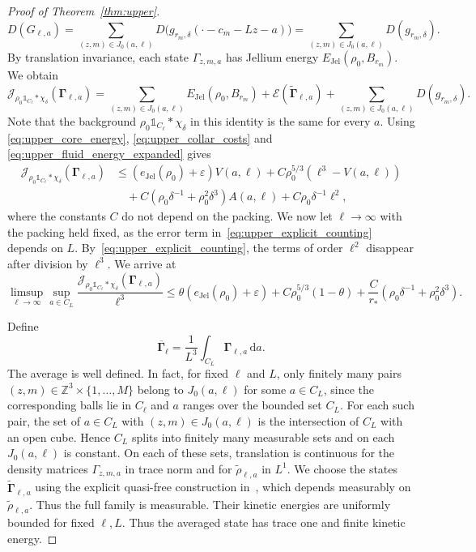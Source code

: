 \documentclass[final,reqno]{amsart}
\theoremstyle{remark}
\theoremstyle{definition}
\renewcommand{\le}{\leqslant}
\newcommand{\ZZ}{\mathbb{Z}}
\newcommand{\iden}{\mathbb{1}}
\newcommand{\EC}{\mathcal{E}}
\newcommand{\Jel}{\mathrm{Jel}}
\newcommand{\vGamma}{{\bm{\Gamma}}}
\begin{document}
\begin{proof}[Proof of Theorem~\ref{thm:upper}]
\[
D(G_{\ell,a})=\sum_{(z,m)\in J_0(a,\ell)}D\big(g_{r_m,\delta}(\cdot-c_m-Lz-a)\big)=\sum_{(z,m)\in J_0(a,\ell)}D(g_{r_m,\delta}).
\]
By translation invariance, each state $\Gamma_{z,m,a}$ has Jellium energy $E_\Jel(\rho_0,B_{r_m})$. We obtain
\begin{equation}\label{eq:upper_exact_identity}
\mathcal J_{\rho_0\iden_{C_\ell}*\chi_\delta}(\vGamma_{\ell,a})
=\sum_{(z,m)\in J_0(a,\ell)}
E_\Jel(\rho_0,B_{r_m})
+\EC(\tilde\vGamma_{\ell,a})
+\sum_{(z,m)\in J_0(a,\ell)}D(g_{r_m,\delta}).
\end{equation}
Note that the background $\rho_0\iden_{C_\ell}*\chi_\delta$ in this identity is the same for every $a$.
Using \eqref{eq:upper_core_energy}, \eqref{eq:upper_collar_costs} and \eqref{eq:upper_fluid_energy_expanded} gives
\begin{equation}\label{eq:upper_prelimit_estimate}
\begin{aligned}
\mathcal J_{\rho_0\iden_{C_\ell}*\chi_\delta}(\vGamma_{\ell,a})
&\le(e_\Jel(\rho_0)+\varepsilon)V(a,\ell)
+C\rho_0^{5/3}(\ell^3-V(a,\ell))\\
&\quad+C\left(\rho_0\delta^{-1}+\rho_0^2\delta^3\right)A(a,\ell)+C\rho_0\delta^{-1}\ell^2,
\end{aligned}
\end{equation}
where the constants $C$ do not depend on the packing. We now let $\ell\to\infty$ with the packing held fixed, as the error term in~\eqref{eq:upper_explicit_counting} depends on $L$. By~\eqref{eq:upper_explicit_counting}, the terms of order $\ell^2$ disappear after division by $\ell^3$. We arrive at
\begin{equation}\label{eq:upper_fixed_packing}
\limsup_{\ell\to\infty}\sup_{a\in C_L}
\frac{\mathcal J_{\rho_0\iden_{C_\ell}*\chi_\delta}(\vGamma_{\ell,a})}{\ell^3}
\le\theta(e_\Jel(\rho_0)+\varepsilon)+C\rho_0^{5/3}(1-\theta)
+\frac{C}{r_*}\left(\rho_0\delta^{-1}+\rho_0^2\delta^3\right).
\end{equation}

Define
\[
\overline{\vGamma}_\ell=\frac1{L^3}\int_{C_L}\vGamma_{\ell,a}\,\mathrm da.
\]
The average is well defined. In fact, for fixed $\ell$ and $L$, only finitely many pairs $(z,m)\in\ZZ^3\times\{1,\dots,M\}$ belong to $J_0(a,\ell)$ for some $a\in C_L$, since the corresponding balls lie in $C_\ell$ and $a$ ranges over the bounded set $C_L$. For each such pair, the set of $a\in C_L$ with $(z,m)\in J_0(a,\ell)$ is the intersection of $C_L$ with an open cube. Hence $C_L$ splits into finitely many measurable sets and on each $J_0(a,\ell)$ is constant. On each of these sets, translation is continuous for the density matrices $\Gamma_{z,m,a}$ in trace norm and for $\tilde\rho_{\ell,a}$ in $L^1$. We choose the states $\tilde\vGamma_{\ell,a}$ using the explicit quasi-free construction in~\cite[proof of Thm.~8 and Sec.~3.3]{lewin2020local}, which depends measurably on $\tilde\rho_{\ell,a}$. Thus the full family is measurable. Their kinetic energies are uniformly bounded for fixed $\ell,L$. Thus the averaged state has trace one and finite kinetic energy.


\end{proof}
\end{document}
